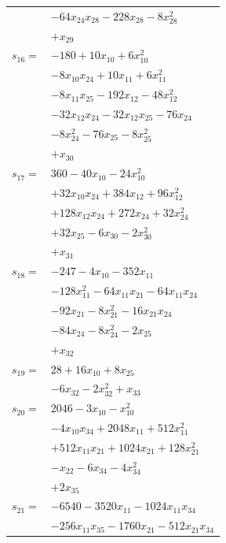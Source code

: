 \begin{longtable}{@{}r@{\;}l@{}}
 & \(\displaystyle -64x_{24}x_{28} -228x_{28} -8x_{28}^{2}\) \\
 & \(\displaystyle +x_{29}\) \\[3pt]
\(s_{16}=\) & \(\displaystyle -180 +10x_{10} +6x_{10}^{2}\) \\
 & \(\displaystyle -8x_{10}x_{24} +10x_{11} +6x_{11}^{2}\) \\
 & \(\displaystyle -8x_{11}x_{25} -192x_{12} -48x_{12}^{2}\) \\
 & \(\displaystyle -32x_{12}x_{24} -32x_{12}x_{25} -76x_{24}\) \\
 & \(\displaystyle -8x_{24}^{2} -76x_{25} -8x_{25}^{2}\) \\
 & \(\displaystyle +x_{30}\) \\[3pt]
\(s_{17}=\) & \(\displaystyle 360 -40x_{10} -24x_{10}^{2}\) \\
 & \(\displaystyle +32x_{10}x_{24} +384x_{12} +96x_{12}^{2}\) \\
 & \(\displaystyle +128x_{12}x_{24} +272x_{24} +32x_{24}^{2}\) \\
 & \(\displaystyle +32x_{25} -6x_{30} -2x_{30}^{2}\) \\
 & \(\displaystyle +x_{31}\) \\[3pt]
\(s_{18}=\) & \(\displaystyle -247 -4x_{10} -352x_{11}\) \\
 & \(\displaystyle -128x_{11}^{2} -64x_{11}x_{21} -64x_{11}x_{24}\) \\
 & \(\displaystyle -92x_{21} -8x_{21}^{2} -16x_{21}x_{24}\) \\
 & \(\displaystyle -84x_{24} -8x_{24}^{2} -2x_{25}\) \\
 & \(\displaystyle +x_{32}\) \\[3pt]
\(s_{19}=\) & \(\displaystyle 28 +16x_{10} +8x_{25}\) \\
 & \(\displaystyle -6x_{32} -2x_{32}^{2} +x_{33}\) \\[3pt]
\(s_{20}=\) & \(\displaystyle 2046 -3x_{10} -x_{10}^{2}\) \\
 & \(\displaystyle -4x_{10}x_{34} +2048x_{11} +512x_{11}^{2}\) \\
 & \(\displaystyle +512x_{11}x_{21} +1024x_{21} +128x_{21}^{2}\) \\
 & \(\displaystyle -x_{22} -6x_{34} -4x_{34}^{2}\) \\
 & \(\displaystyle +2x_{35}\) \\[3pt]
\(s_{21}=\) & \(\displaystyle -6540 -3520x_{11} -1024x_{11}x_{34}\) \\
 & \(\displaystyle -256x_{11}x_{35} -1760x_{21} -512x_{21}x_{34}\) \\

\end{longtable}
